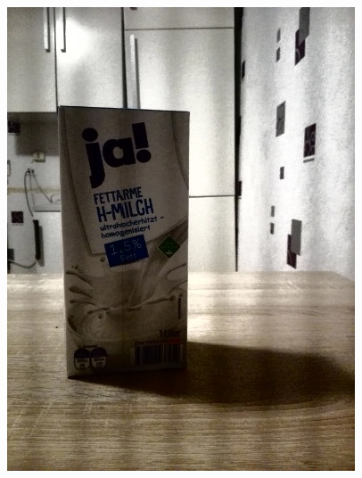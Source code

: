\begin{appendices}
\begin{figure}[htb]
\begin{minipage}{0.19\textwidth}
\end{minipage}
\begin{minipage}{\textwidth}
\hspace{\textwidth}
\end{minipage}
\begin{minipage}{0.19\textwidth}
\includegraphics[width=\textwidth]{images/anomalien/HA/image41.jpg}
\end{minipage}
\begin{minipage}{0.19\textwidth}

\end{minipage}
\end{figure}
\end{appendices}
